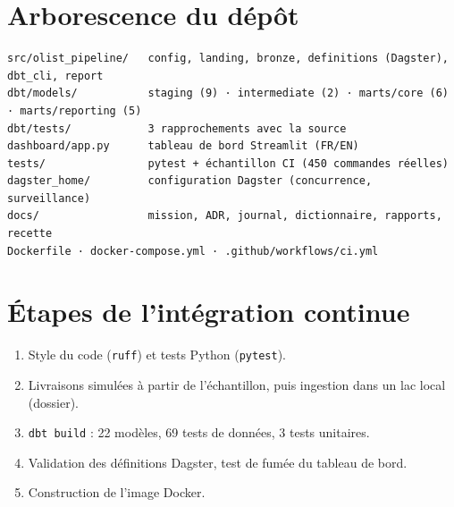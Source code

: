 \documentclass[11pt, a4paper, oneside, headings=normal, numbers=noenddot, DIV=12]{scrartcl}
\begin{document}
\clearpage
\appendix
\section{Arborescence du dépôt}
\begin{lstlisting}[language={}]
src/olist_pipeline/   config, landing, bronze, definitions (Dagster), dbt_cli, report
dbt/models/           staging (9) · intermediate (2) · marts/core (6) · marts/reporting (5)
dbt/tests/            3 rapprochements avec la source
dashboard/app.py      tableau de bord Streamlit (FR/EN)
tests/                pytest + échantillon CI (450 commandes réelles)
dagster_home/         configuration Dagster (concurrence, surveillance)
docs/                 mission, ADR, journal, dictionnaire, rapports, recette
Dockerfile · docker-compose.yml · .github/workflows/ci.yml
\end{lstlisting}

\section{Étapes de l'intégration continue}
\begin{enumerate}[leftmargin=1.4em]
  \item Style du code (\texttt{ruff}) et tests Python (\texttt{pytest}).
  \item Livraisons simulées à partir de l'échantillon, puis ingestion dans un lac local (dossier).
  \item \texttt{dbt build} : 22 modèles, 69 tests de données, 3 tests unitaires.
  \item Validation des définitions Dagster, test de fumée du tableau de bord.
  \item Construction de l'image Docker.
\end{enumerate}
\end{document}
